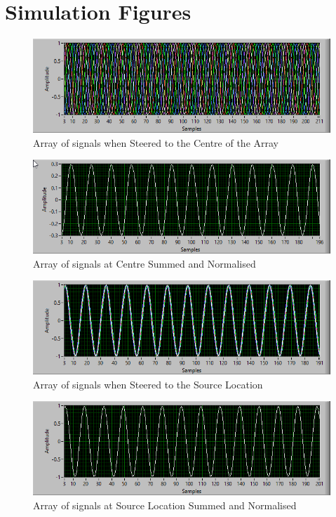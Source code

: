 \documentclass{UoNMCHA}
\numberwithin{equation}{section}
\begin{document}
\section{Simulation Figures} \label{app:Sim}
    \begin{figure}[H]
        \centering
        \includegraphics[keepaspectratio, width = \textwidth]{Figures/SimSignalCentre.png}
        \caption{Array of signals when Steered to the Centre of the Array}
    \end{figure}
    \begin{figure}[H]
        \centering
        \includegraphics[keepaspectratio, width = \textwidth]{Figures/SimSignalCentreSum.png}
        \caption{Array of signals at Centre Summed and Normalised}
    \end{figure}
    \begin{figure}[H]
        \centering
        \includegraphics[keepaspectratio, width = \textwidth]{Figures/SimSignalLocation.png}
        \caption{Array of signals when Steered to the Source Location}
    \end{figure}
    \begin{figure}[H]
        \centering
        \includegraphics[keepaspectratio, width = \textwidth]{Figures/SimSignalLocationSum.png}
        \caption{Array of signals at Source Location Summed and Normalised}
    \end{figure}
\end{document}

